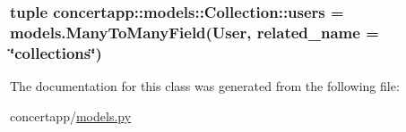 \label{classconcertapp_1_1models_1_1_collection_a9753ffd883189e01f654151773b2789d}
\hypertarget{classconcertapp_1_1models_1_1_collection_aee261cad48467e51bb8afd390b90b0bd}{
\subsubsection[{users}]{\setlength{\rightskip}{0pt plus 5cm}tuple {\bf concertapp::models::Collection::users} = models.ManyToManyField(User, related\_\-name = \char`\"{}collections\char`\"{})}}
\label{classconcertapp_1_1models_1_1_collection_aee261cad48467e51bb8afd390b90b0bd}


The documentation for this class was generated from the following file:\begin{DoxyCompactItemize}
\item 
concertapp/\hyperlink{models_8py}{models.py}\end{DoxyCompactItemize}
